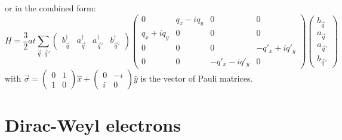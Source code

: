 or in the combined form:
\begin{equation*}
	H=\frac{3}{2} a t \sum_{\vec q, \vec{q}'}
		\left( \begin{array}{cccc} b^{\dagger}_{\vec{q}} & a^{\dagger}_{\vec{q}} & a^{\dagger}_{\vec{q}'} & b^{\dagger}_{\vec{q}'}
																							\end{array} \right)
		\left( \begin{array}{cccc}
			0              & q_x - i q_y & 0            & 0 \\
			q_x+i q_y      & 0           & 0            & 0 \\                            
			0              & 0           & 0            & -q'_x+i q'_y \\
			0              & 0           & -q'_x-i q'_y & 0			            			\end{array} \right)
		\left( \begin{array}{c } b_{\vec{q}} \\ a_{\vec{q}} \\ a_{\vec{q}'} \\ b_{\vec{q}'}  \end{array} \right)			
\end{equation*}
with $\vec{\sigma}= \left( \begin{array}{cc} 0 & 1 \\ 1 & 0 \end{array} \right) \hat{x}+\left( \begin{array}{cc} 0 & -i \\ i & 0 \end{array} \right) \hat{y}$ is the vector of Pauli matrices.

\section{Dirac-Weyl electrons}